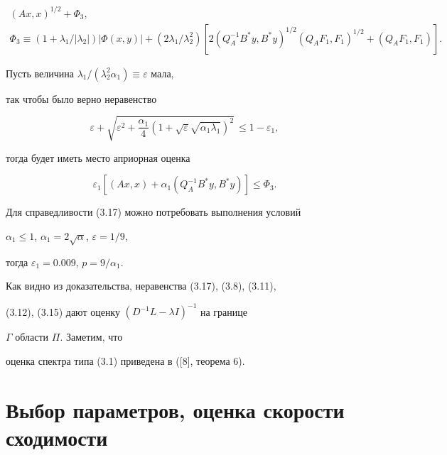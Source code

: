 \begin{pf}
\begin{gather*}
(Ax,x)^{1/2}+\Phi_3, \\ 


% 


\Phi_3\equiv(1+\lambda_1/|\lambda_2|)|\Phi(x,y)|+ 


(2\lambda_1/\lambda^2_2)[2(Q^{-1}_A B^*y,B^*y)^{1/2} 


(Q_A F_1,F_1)^{1/2}+(Q_A F_1,F_1)]. 


\end{gather*} 


 


Пусть величина $\lambda_1/(\lambda^2_2\alpha_1)\equiv\varepsilon$ мала, 


так чтобы было верно неравенство 


\begin{equation} 


\varepsilon+\sqrt{\varepsilon^2+\frac{\alpha_1}{4}\left(1+ 


\sqrt{\varepsilon}\sqrt{\alpha_1\lambda_1}\right)^2}\,\le 


1-\varepsilon_1, 


\end{equation} 


тогда будет иметь место априорная оценка 


$$ 


\varepsilon_1[(Ax,x)+\alpha_1(Q^{-1}_A B^*y,B^*y)]\le\Phi_3. 


$$ 


Для справедливости (3.17) можно потребовать выполнения условий 


$\alpha_1\le1$, $\alpha_1=2\sqrt{\alpha}$, $\varepsilon=1/9$, 


тогда $\varepsilon_1=0.009$, $p=9/\alpha_1$. 


\end{pf} 


 


Как видно из доказательства, неравенства (3.17), (3.8), (3.11), 


(3.12), (3.15) дают оценку $(D^{-1}L-\lambda I)^{-1}$ на границе 


$\Gamma$ области $\Pi$. Заметим, что 


оценка спектра типа (3.1) приведена в ([8], теорема 6). 


 


 


\section{Выбор параметров, оценка скорости сходимости} 


